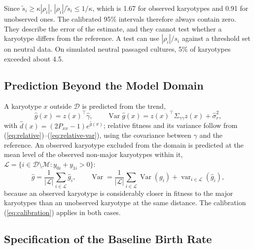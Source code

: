 \documentclass[11pt]{article}
\begin{document}
Since $\tilde s_i\ge\kappa|\rho_i|$, $|\rho_i|/\tilde s_i\le1/\kappa$, which is
1.67 for observed karyotypes and 0.91 for unobserved ones. The calibrated
95\% intervals therefore always contain zero. They describe the error of the
estimate, and they cannot test whether a karyotype differs from the
reference. A test can use $|\rho_i|/s_i$ against a threshold set on neutral
data. On simulated neutral passaged cultures, 5\% of karyotypes exceeded
about 4.5.

\subsection{Prediction Beyond the Model Domain}
\label{sec:sj-predict}

A karyotype $x$ outside $\mathcal{D}$ is predicted from the trend,
\begin{equation}
  \hat g(x)=z(x)^\top\hat\gamma,\qquad
  \operatorname{Var}\hat g(x)=z(x)^\top\Sigma_{\gamma\gamma}z(x)+\hat\sigma_r^2,
  \label{eq:predict-trend}
\end{equation}
with $\hat d(x)=(2P_{xx}-1)e^{\hat g(x)}$; relative fitness and its variance
follow from (\ref{eq:relative})--(\ref{eq:relative-var}), using the covariance
between $\gamma$ and the reference. An observed karyotype excluded from the
domain is predicted at the mean level of the observed non-major karyotypes
within it, $\mathcal{L}=\{i\in\mathcal{D}\setminus\mathcal{M}:y_{0i}+y_{1i}>0\}$:
\begin{equation}
  \hat g=\frac{1}{|\mathcal{L}|}\sum_{i\in\mathcal{L}}\hat g_i,\qquad
  \operatorname{Var}=\frac{1}{|\mathcal{L}|}\sum_{i\in\mathcal{L}}\operatorname{Var}(g_i)
  +\operatorname{var}_{i\in\mathcal{L}}(\hat g_i),
  \label{eq:predict-level}
\end{equation}
because an observed karyotype is considerably closer in fitness to the major
karyotypes than an unobserved karyotype at the same distance. The calibration
(\ref{eq:calibration}) applies in both cases.

\subsection{Specification of the Baseline Birth Rate}
\label{sec:sj-rate}
\end{document}
